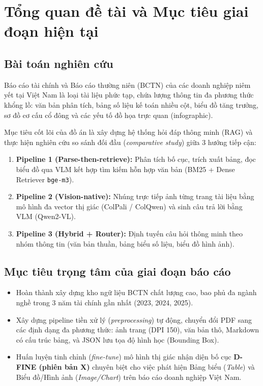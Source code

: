 \documentclass[a4paper,12pt]{article}
\begin{document}
\section{Tổng quan đề tài và Mục tiêu giai đoạn hiện tại}

\subsection{Bài toán nghiên cứu}
Báo cáo tài chính và Báo cáo thường niên (BCTN) của các doanh nghiệp niêm yết tại Việt Nam là loại tài liệu phức tạp, chứa lượng thông tin đa phương thức khổng lồ: văn bản phân tích, bảng số liệu kế toán nhiều cột, biểu đồ tăng trưởng, sơ đồ cơ cấu cổ đông và các yếu tố đồ họa trực quan (infographic).

Mục tiêu cốt lõi của đồ án là xây dựng hệ thống hỏi đáp thông minh (RAG) và thực hiện nghiên cứu so sánh đối đầu (\textit{comparative study}) giữa 3 hướng tiếp cận:
\begin{enumerate}[label=\textbf{\arabic*.}]
    \item \textbf{Pipeline 1 (Parse-then-retrieve):} Phân tích bố cục, trích xuất bảng, đọc biểu đồ qua VLM kết hợp tìm kiếm hỗn hợp văn bản (BM25 + Dense Retriever \texttt{bge-m3}).
    \item \textbf{Pipeline 2 (Vision-native):} Nhúng trực tiếp ảnh từng trang tài liệu bằng mô hình đa vector thị giác (ColPali / ColQwen) và sinh câu trả lời bằng VLM (Qwen2-VL).
    \item \textbf{Pipeline 3 (Hybrid + Router):} Định tuyến câu hỏi thông minh theo nhóm thông tin (văn bản thuần, bảng biểu số liệu, biểu đồ hình ảnh).
\end{enumerate}

\subsection{Mục tiêu trọng tâm của giai đoạn báo cáo}
\begin{itemize}[noitemsep]
    \item Hoàn thành xây dựng kho ngữ liệu BCTN chất lượng cao, bao phủ đa ngành nghề trong 3 năm tài chính gần nhất (2023, 2024, 2025).
    \item Xây dựng pipeline tiền xử lý (\textit{preprocessing}) tự động, chuyển đổi PDF sang các định dạng đa phương thức: ảnh trang (DPI 150), văn bản thô, Markdown có cấu trúc bảng, và JSON lưu tọa độ hình học (Bounding Box).
    \item Huấn luyện tinh chỉnh (\textit{fine-tune}) mô hình thị giác nhận diện bố cục \textbf{D-FINE (phiên bản X)} chuyên biệt cho việc phát hiện Bảng biểu (\textit{Table}) và Biểu đồ/Hình ảnh (\textit{Image/Chart}) trên báo cáo doanh nghiệp Việt Nam.
\end{itemize}
\end{document}
